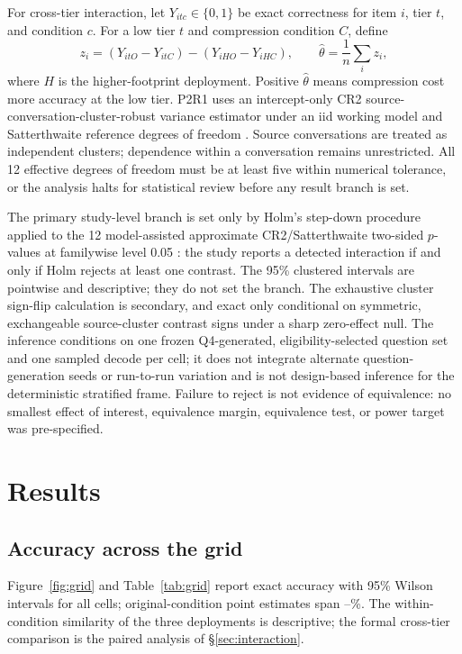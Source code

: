 \documentclass[11pt]{article}
\begin{document}
For cross-tier interaction, let $Y_{itc}\in\{0,1\}$ be exact correctness for
item $i$, tier $t$, and condition $c$. For a low tier $t$ and compression
condition $C$, define
\[
 z_i=(Y_{itO}-Y_{itC})-(Y_{iHO}-Y_{iHC}),
 \qquad \widehat\theta=\frac{1}{n}\sum_i z_i,
\]
where $H$ is the higher-footprint deployment. Positive $\widehat\theta$ means
compression cost more accuracy at the low tier. P2R1 uses an intercept-only
CR2 source-conversation-cluster-robust variance estimator under an iid working
model and Satterthwaite reference degrees of freedom
\citep{bell2002bias,pustejovsky2018small}. Source conversations are treated as
independent clusters; dependence within a conversation remains unrestricted.
All 12 effective degrees of freedom must be at least five within numerical
tolerance, or the analysis halts for statistical review before any result
branch is set.

The primary study-level branch is set only by Holm's step-down procedure
applied to the 12 model-assisted approximate CR2/Satterthwaite two-sided
$p$-values at familywise level 0.05 \citep{holm1979simple}: the study reports
a detected interaction if and only if Holm rejects at least one contrast. The
95\% clustered intervals are pointwise and descriptive; they do not set the
branch. The exhaustive cluster sign-flip calculation is secondary, and exact
only conditional on symmetric, exchangeable source-cluster contrast signs
under a sharp zero-effect null. The inference conditions on one frozen Q4-generated,
eligibility-selected question set and one sampled decode per cell; it does not
integrate alternate question-generation seeds or run-to-run variation and is
not design-based inference for the deterministic stratified frame. Failure to
reject is not evidence of equivalence: no smallest effect of interest,
equivalence margin, equivalence test, or power target was pre-specified.

\section{Results}\label{sec:results}

\subsection{Accuracy across the grid}

Figure~\ref{fig:grid} and Table~\ref{tab:grid} report exact accuracy with 95\%
Wilson intervals for all \PtwoNCells{} cells; original-condition point
estimates span \PtwoOAccMin--\PtwoOAccMax\%. The within-condition similarity
of the three deployments is descriptive; the formal cross-tier comparison is
the paired analysis of \S\ref{sec:interaction}.
\end{document}
